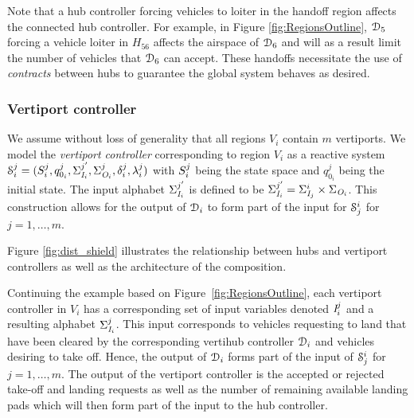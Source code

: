 Note that a hub controller forcing vehicles to loiter in the handoff region affects the connected hub controller.
For example, in Figure \ref{fig:RegionsOutline}, $\mathcal{D}_5$ forcing a vehicle loiter in $H_{56}$ affects the airspace of $\mathcal{D}_6$ and will as a result limit the number of vehicles that $\mathcal{D}_6$ can accept.
These handoffs necessitate the use of \emph{contracts} between hubs to guarantee the global system behaves as desired. 



\subsubsection*{Vertiport controller} We assume without loss of generality that all regions $V_i$ contain $m$ vertiports. We model the \emph{vertiport controller} corresponding to region $V_i$ as a reactive system  $\mathcal{S}_i^j = (S^j_i,q^j_{0_i},\Sigma_{\textit{I}_{i}}^{j'},\Sigma_{\textit{O}_{i}}^j,\delta^j_i,\lambda^j_i)$ with $S^j_i$ being the state space and $q^j_{0_i}$ being the initial state. The input alphabet $\Sigma_{\textit{I}_{i}}^{j'}$ is defined to be $\Sigma_{\textit{I}_{i}}^{j'} = \Sigma_{\textit{I}_{j}}^i\times \Sigma_{\textit{O}_{i}}$. This construction allows for the output of $\mathcal{D}_i$ to form part of the input for $\mathcal{S}^i_j$ for $j = 1,\dots,m$. %

Figure \ref{fig:dist_shield} illustrates the relationship between hubs and vertiport controllers as well as the architecture of the composition. 


\begin{eg}
Continuing the example based on Figure~\ref{fig:RegionsOutline}, each vertiport controller in $V_i$ has a corresponding set of input variables denoted $\textit{I}_i^j$ and a resulting alphabet $\Sigma_{\textit{I}_{i}}^j$. This input corresponds to vehicles requesting to land that have been cleared by the corresponding vertihub controller  $\mathcal{D}_i$ and vehicles desiring to take off.
Hence, the output of $\mathcal{D}_i$ forms part of the input of $\mathcal{S}^i_j$ for $j = 1,\dots,m$.
The output of the vertiport controller is the accepted or rejected take-off and landing requests as well as the number of remaining available landing pads which will then form part of the input to the hub controller. 
\end{eg}



